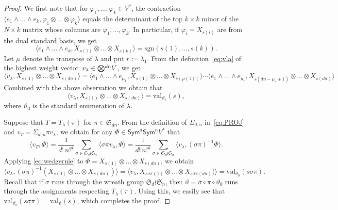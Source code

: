 \documentclass[11pt]{amsart}
\def\sgn{\mathrm{sgn}}
\def\Sym{\mathsf{Sym}}
\def\la{\lambda}
\def\ot{\otimes}
\newcommand{\aS}{\ensuremath{\mathfrak{S}}}
\newcommand{\tensor}{\smash{\textstyle\bigotimes}}
\newcommand{\val}{\mathrm{val}}
\numberwithin{equation}{section}
\begin{document}
\begin{proof} 
We first note that for $\varphi_1,\ldots,\varphi_k \in V^*$, the contraction
$\langle e_1\wedge\ldots\wedge e_{k},  \varphi_{1} \ot\ldots\ot \varphi_{k} \rangle$ 
equals the determinant of the top $k\times k$ minor 
of the $N\times k$ matrix whose columns are $\varphi_{1},\ldots,\varphi_{k}$.
In particular, if $\varphi_i = X_{s(i)}$ are from the dual standard basis, we get 
$$
\langle e_1\wedge\ldots\wedge e_{k},  X_{s(1)} \ot\ldots\ot X_{s(k)} \rangle = 
 \sgn (s(1),\ldots,s(k)).
$$
Let $\mu$ denote the transpose of $\la$ and put $r:=\la_1$.
From the definition~\eqref{eq:vla} of the highest weight vector~$v_\la \in \tensor^{dn} V$, we get 
$$
 \langle v_\la , X_{s(1)} \ot\ldots\ot X_{s(dn)} \rangle = 
 \langle e_1\wedge\ldots\wedge e_{\mu_1},  X_{s(1)} \ot\ldots\ot X_{s(\mu(1))} \rangle \cdots 
 \langle e_1\wedge\ldots\wedge e_{\mu_r},  X_{s(dn-\mu_r+1)} \ot\ldots\ot X_{s(dn)} \rangle 
$$
Combined with the above observation we obtain that
\begin{equation}\label{eq:wedgerule}
 \langle v_\la , X_{s(1)} \ot\ldots\ot X_{s(dn)} \rangle = \val_{\vartheta_0} (s) ,
\end{equation}
where $\vartheta_0$ is the standard enumeration of $\la$. 

Suppose that $T=T_\la(\pi)$ for $\pi\in\aS_{dn}$. 
From the definition of $\Sigma_{d,n}$ in~\eqref{eq:PROJ} and 
$v_T= \Sigma_{d,n} \pi v_\la$, %
we obtain for any $\Phi\in \Sym^d\Sym^n V^*$ that 
\begin{equation*}%
 \langle v_T,\Phi\rangle %
 =  \frac{1}{d!\, n!^d} \sum_{\sigma \in \aS_d\wr \aS_n} \langle \sigma\pi v_\la , \Phi\rangle
 = \frac{1}{d!\, n!^d} \sum_{\sigma \in \aS_d \wr \aS_n} \langle v_\la , (\sigma\pi)^{-1} \Phi\rangle.
\end{equation*}
Applying \eqref{eq:wedgerule} to 
$\Phi = X_{s(1)} \ot\ldots\ot X_{s(dn)}$, we obtain 
$$
 \langle v_\la , (\sigma\pi)^{-1} (X_{s(1)} \ot\ldots\ot X_{s(dn)}) \rangle 
 = \langle v_\la , X_{s\sigma\pi(1)} \ot\ldots\ot X_{s\sigma\pi(dn)}) \rangle 
 = \val_{\vartheta_0} (s\sigma\pi) .
$$ 
Recall that if $\sigma$ runs through the wreath group $\aS_d\wr\aS_n$, 
then $\vartheta = \sigma\circ\pi\circ\vartheta_0$  
runs through the assignments respecting $T_\la(\pi)$. 
Using this, we easily see that 
$\val_{\vartheta_0} (s\sigma\pi) = \val_{\vartheta} (s)$, 
which completes the proof.
\end{proof}
\end{document}
